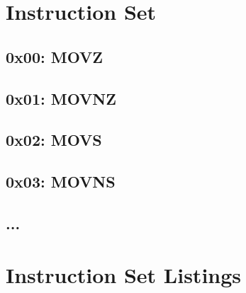 \documentclass[oneside, a4paper]{memoir}
\begin{document}
\chapter{Instruction Set}
\section*{0x00: MOVZ}
\section*{0x01: MOVNZ}
\section*{0x02: MOVS}
\section*{0x03: MOVNS}
\section*{...}

\appendix
\chapter{Instruction Set Listings}
\end{document}
